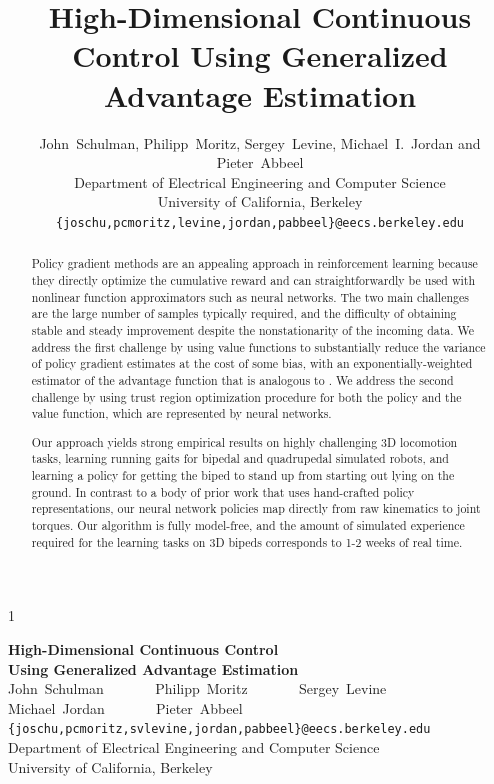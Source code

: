 \documentclass{article}
\author{John~Schulman, Philipp~Moritz, Sergey~Levine, Michael~I.~Jordan and Pieter~Abbeel \\
Department of Electrical Engineering and Computer Science\\
University of California, Berkeley\\
\texttt{\{joschu,pcmoritz,levine,jordan,pabbeel\}@eecs.berkeley.edu}
}
\title{High-Dimensional Continuous Control Using Generalized Advantage Estimation}
\def\arxiv{0}
\begin{document}
\if\arxiv1
\vspace{1cm}
\begin{center}
{\LARGE {\bf{High-Dimensional Continuous Control \\ \vspace{.15cm} Using Generalized Advantage Estimation}}} \\
\vspace{.5cm}
{\large
John~Schulman ~~~~~~
Philipp~Moritz ~~~~~~
Sergey~Levine ~~~~~~ \\
\vspace{.1cm}
Michael~Jordan ~~~~~~
Pieter~Abbeel
} \\
\vspace{.2cm}
{\tt \{joschu,pcmoritz,svlevine,jordan,pabbeel\}@eecs.berkeley.edu} \\
\vspace{.2cm}
{\large
Department of Electrical Engineering and Computer Science \\
\vspace{.1cm}
University of California, Berkeley
}
\vspace*{.2in}
\end{center}
\else
\maketitle
\fi


\begin{abstract}

Policy gradient methods are an appealing approach in reinforcement learning because they directly optimize the cumulative reward and can straightforwardly be used with nonlinear function approximators such as neural networks.
The two main challenges are the large number of samples typically required, and  the difficulty of obtaining stable and steady improvement despite the nonstationarity of the incoming data.
We address the first challenge by using value functions to
substantially reduce the variance of policy gradient estimates at the
cost of some bias, with an exponentially-weighted estimator of the
advantage function that is analogous to \tdlam{}.
We address the second challenge by using trust region optimization procedure for both the policy and the value function, which are represented by neural networks.

Our approach yields strong empirical results on highly challenging 3D
locomotion tasks, learning running gaits for bipedal and quadrupedal
simulated robots, and learning a policy for getting the biped to stand up from starting out lying on the ground.
In contrast to a body of prior work that uses hand-crafted policy
representations, our neural network policies map directly from raw
kinematics to joint torques.
Our algorithm is fully model-free, and the amount of simulated experience required for the learning tasks on 3D bipeds corresponds to 1-2 weeks of real time.


\end{abstract}
\end{document}
